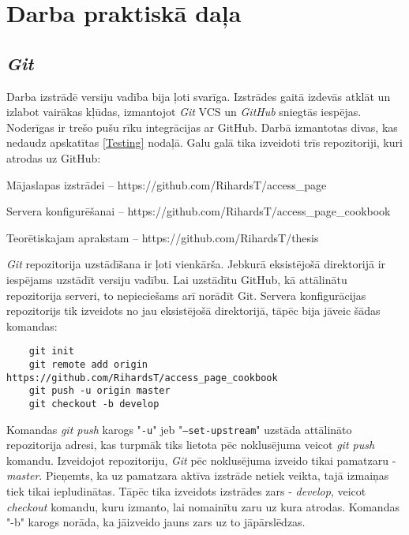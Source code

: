 \chapter{Darba praktiskā daļa}

\section{\textit{Git}}
Darba izstrādē versiju vadība bija ļoti svarīga. Izstrādes gaitā izdevās atklāt un izlabot vairākas kļūdas, izmantojot \textit{Git} VCS un \textit{GitHub} sniegtās iespējas. Noderīgas ir trešo pušu rīku integrācijas ar GitHub. Darbā izmantotas divas, kas nedaudz apskatītas \ref{Testing} nodaļā. Galu galā tika izveidoti trīs repozitoriji, kuri atrodas uz GitHub:
\begin{describe}
	\item Mājaslapas izstrādei -- https://github.com/RihardsT/access_page
	\item Servera konfigurēšanai -- https://github.com/RihardsT/access_page_cookbook
	\item Teorētiskajam aprakstam -- https://github.com/RihardsT/thesis
\end{describe}

\textit{Git} repozitorija uzstādīšana ir ļoti vienkārša. Jebkurā eksistējošā direktorijā ir iespējams uzstādīt versiju vadību. Lai uzstādītu GitHub, kā attālinātu repozitorija serveri, to nepieciešams arī norādīt Git. Servera konfigurācijas repozitorijs tik izveidots no jau eksistējošā direktorijā, tāpēc bija jāveic šādas komandas:
\begin{lstlisting}
	git init
	git remote add origin  https://github.com/RihardsT/access_page_cookbook
	git push -u origin master
	git checkout -b develop
\end{lstlisting}
Komandas \textit{git push} karogs "\texttt{-u}" jeb "\texttt{--set-upstream}" uzstāda attālināto repozitorija adresi, kas turpmāk tiks lietota pēc noklusējuma veicot \textit{git push} komandu. Izveidojot repozitoriju, \textit{Git} pēc noklusējuma izveido tikai pamatzaru - \textit{master}. Pieņemts, ka uz pamatzara aktīva izstrāde netiek veikta, tajā izmaiņas tiek tikai iepludinātas. Tāpēc tika izveidots izstrādes zars - \textit{develop}, veicot \textit{checkout} komandu, kuru izmanto, lai nomainītu zaru uz kura atrodas. Komandas "-b" karogs norāda, ka jāizveido jauns zars uz to jāpārslēdzas.

